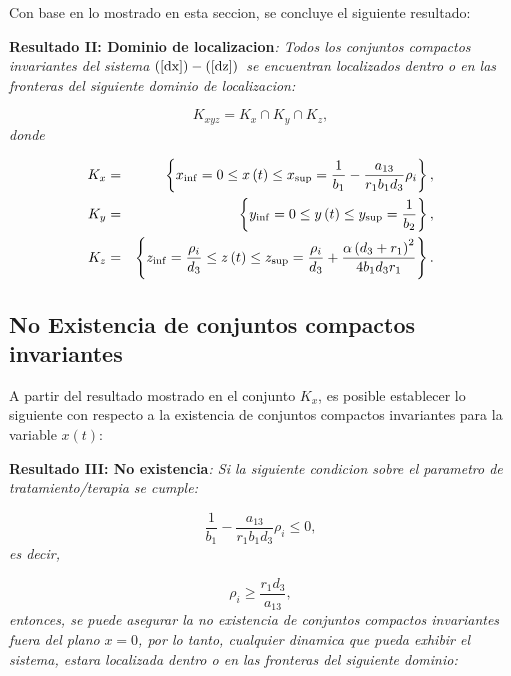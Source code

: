 \documentclass[letterpaper,11pt]{article}
\begin{document}
Con base en lo mostrado en esta seccion, se concluye el siguiente resultado:

\bigskip

\textbf{Resultado II: Dominio de localizacion}\textit{: Todos los conjuntos
compactos invariantes del sistema }$\left( \ref{dx}\right) -\left( \ref{dz}%
\right) $\textit{\ se encuentran localizados dentro o en las fronteras del
siguiente dominio de localizacion:}

\bigskip 
\begin{equation*}
K_{xyz}=K_{x}\cap K_{y}\cap K_{z},
\end{equation*}%
\textit{donde}

\bigskip 
\begin{eqnarray*}
K_{x} &=&\left\{ x_{\inf }=0\leq x\left( t\right) \leq x_{\sup }=\frac{1}{%
b_{1}}-\frac{a_{13}}{r_{1}b_{1}d_{3}}\rho _{i}\right\} , \\
K_{y} &=&\left\{ y_{\inf }=0\leq y\left( t\right) \leq y_{\sup }=\frac{1}{%
b_{2}}\right\} , \\
K_{z} &=&\left\{ z_{\inf }=\frac{\rho _{i}}{d_{3}}\leq z\left( t\right) \leq
z_{\sup }=\frac{\rho _{i}}{d_{3}}+\frac{\alpha \left( d_{3}+r_{1}\right) ^{2}%
}{4b_{1}d_{3}r_{1}}\right\} .
\end{eqnarray*}

\subsection{\protect\bigskip No Existencia de conjuntos compactos invariantes%
}

A partir del resultado mostrado en el conjunto $K_{x}$, es posible
establecer lo siguiente con respecto a la existencia de conjuntos compactos
invariantes para la variable $x\left( t\right) $:

\bigskip

\textbf{Resultado III: No existencia}\textit{: Si la siguiente condicion
sobre el parametro de tratamiento/terapia se cumple:}

\begin{equation*}
\frac{1}{b_{1}}-\frac{a_{13}}{r_{1}b_{1}d_{3}}\rho _{i}\leq 0,
\end{equation*}%
\textit{es decir,}

\bigskip 
\begin{equation*}
\rho _{i}\geq \frac{r_{1}d_{3}}{a_{13}},
\end{equation*}%
\textit{entonces, se puede asegurar la no existencia de conjuntos compactos
invariantes fuera del plano }$x=0$\textit{, por lo tanto, cualquier dinamica
que pueda exhibir el sistema, estara localizada dentro o en las fronteras
del siguiente dominio:}
\end{document}
